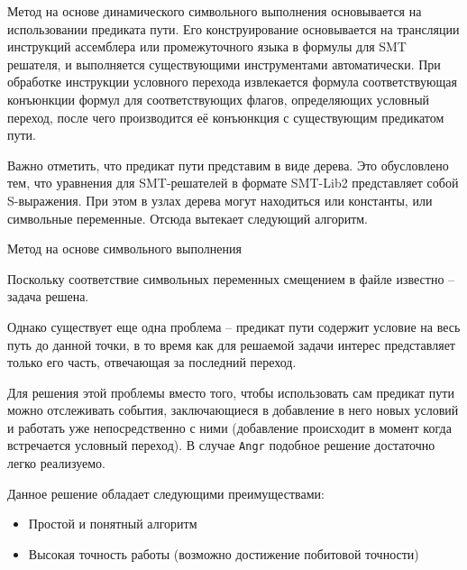 Метод на основе динамического символьного выполнения основывается на использовании предиката пути.
Его конструирование основывается на трансляции инструкций ассемблера или промежуточного языка в формулы для SMT решателя, и выполняется существующими инструментами автоматически.
При обработке инструкции условного перехода извлекается формула соответствующая конъюнкции формул для соответствующих флагов, определяющих условный переход, после чего производится её конъюнкция с существующим предикатом пути.

Важно отметить, что предикат пути представим в виде дерева. Это обусловлено тем, что уравнения для SMT-решателей в формате SMT-Lib2 представляет собой S-выражения. При этом в узлах дерева могут находиться или константы, или символьные переменные. Отсюда вытекает следующий алгоритм.
\bigskip

\begin{algorithm}[H]
\SetAlgoLined
{}
  \caption{Метод на основе символьного выполнения}
\end{algorithm}

\bigskip
Поскольку соответствие символьных переменных смещением в файле известно -- задача решена.

Однако существует еще одна проблема -- предикат пути содержит условие на весь путь до данной точки, в то время как для решаемой задачи интерес представляет только его часть, отвечающая за последний переход.


Для решения этой проблемы вместо того, чтобы использовать сам предикат пути можно отслеживать события, заключающиеся в добавление в него новых условий и работать уже непосредственно с ними (добавление происходит в момент когда встречается условный переход). В случае \texttt{Angr} подобное решение достаточно легко реализуемо.

Данное решение обладает следующими преимуществами:
  \begin{itemize}
    \item Простой и понятный алгоритм
    \item Высокая точность работы (возможно достижение побитовой точности)
  \end{itemize}

